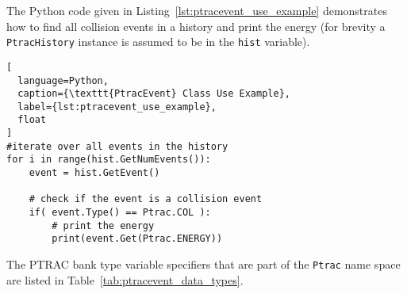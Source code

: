 \documentclass[11pt]{article}
\begin{document}
The Python code given in Listing~\ref{lst:ptracevent_use_example} demonstrates
how to find all collision events in a history and print the energy (for brevity
a \texttt{PtracHistory} instance is assumed to be in the \texttt{hist}
variable).

\begin{lstlisting}[
  language=Python,
  caption={\texttt{PtracEvent} Class Use Example},
  label={lst:ptracevent_use_example},
  float
]
#iterate over all events in the history
for i in range(hist.GetNumEvents()):
    event = hist.GetEvent()

    # check if the event is a collision event
    if( event.Type() == Ptrac.COL ):
        # print the energy
        print(event.Get(Ptrac.ENERGY))
\end{lstlisting}

The PTRAC bank type variable specifiers that are part of the \texttt{Ptrac} name
space are listed in Table~\ref{tab:ptracevent_data_types}.
\end{document}
